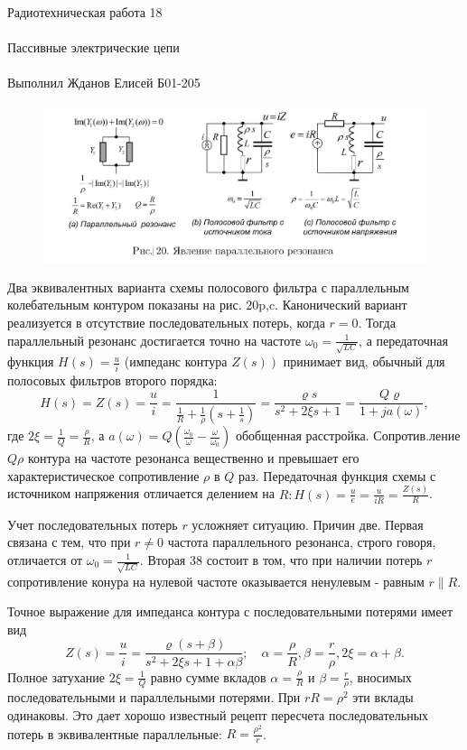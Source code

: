 \documentclass{astroedu-lab}
\begin{document}
\begin{problem}{\huge Радиотехническая работа 18\\\\Пассивные электрические цепи\\\\Выполнил Жданов Елисей Б01-205}
\begin{figure}[!h]
	\centering
	\includegraphics[width=1\textwidth]{5_1.png}
	\label{fig:boiler}
\end{figure}

Два эквивалентных варианта схемы полосового фильтра с параллельным колебательным контуром показаны на рис. 20p,c.
Канонический вариант реализуется в отсутствие последовательных потерь, когда $r=0$. Тогда параллельный резонанс достигается точно на частоте $\omega_0=\frac{1}{\sqrt{L C}}$, а передаточная функция $H(s)=\frac{u}{i}$ (импеданс контура $\left.Z(s)\right)$ принимает вид, обычный для полосовых фильтров второго порядка:
$$
H(s)=Z(s)=\frac{u}{i}=\frac{1}{\frac{1}{R}+\frac{1}{\rho}\left(s+\frac{1}{s}\right)}=\frac{\varrho s}{s^2+2 \xi s+1}=\frac{Q \varrho}{1+j a(\omega)},
$$
где $2 \xi=\frac{1}{Q}=\frac{\rho}{R}$, а $a(\omega)=Q\left(\frac{\omega_0}{\omega}-\frac{\omega}{\omega_0}\right)$ обобщенная расстройка. Сопротив.ление $Q \rho$ контура на частоте резонанса вещественно и превышает его характеристическое сопротивление $\rho$ в $Q$ раз. Передаточная функция схемы с источником напряжения отличается делением на $R: H(s)=\frac{u}{e}=\frac{u}{i R}=\frac{Z(s)}{R}$.

Учет последовательных потерь $r$ усложняет ситуацию. Причин две. Первая связана с тем, что при $r \neq 0$ частота параллельного резонанса, строго говоря, отличается от $\omega_0=\frac{1}{\sqrt{L C}}$. Вторая
38
состоит в том, что при наличии потерь $r$ сопротивление конура на нулевой частоте оказывается ненулевым - равным $r \| R$.

Точное выражение для импеданса контура с последовательными потерями имеет вид
$$
Z(s)=\frac{u}{i}=\frac{\varrho(s+\beta)}{s^2+2 \xi s+1+\alpha \beta} ; \quad \alpha=\frac{\rho}{R}, \beta=\frac{r}{\rho}, 2 \xi=\alpha+\beta .
$$
Полное затухание $2 \xi=\frac{1}{Q}$ равно сумме вкладов $\alpha=\frac{\rho}{R}$ и $\beta=\frac{r}{\rho}$, вносимых последовательными и параллельными потерями. При $r R=\rho^2$ эти вклады одинаковы. Это дает хорошо известный рецепт пересчета последовательных потерь в эквивалентные параллельные: $R=\frac{\rho^2}{r}$.


\end{problem}
\end{document}
